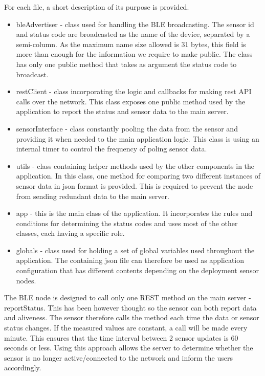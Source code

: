 For each file, a short description of its purpose is provided.
\begin{itemize}
\item bleAdvertiser - class used for handling the BLE broadcasting. The sensor id and status code are broadcasted as the name of the device, separated by a semi-column. As the maximum name size allowed is 31 bytes, this field is more than enough for the information we require to make public. The class has only one public method that takes as argument the status code to broadcast.
\item restClient - class incorporating the logic and callbacks for making rest API calls over the network. This class exposes one public method used by the application to report the status and sensor data to the main server.
\item sensorInterface - class constantly pooling the data from the sensor and providing it when needed to the main application logic. This class is using an internal timer to control the frequency of poling sensor data.
\item utils - class containing helper methods used by the other components in the application. In this class, one method for comparing two different instances of sensor data in json format is provided. This is required to prevent the node from sending redundant data to the main server.
\item app - this is the main class of the application. It incorporates the rules and conditions for determining the status codes and uses most of the other classes, each having a specific role.
\item globals - class used for holding a set of global variables used throughout the application. The containing json file can therefore be used as application configuration that has different contents depending on the deployment sensor nodes.
\end{itemize}

The BLE node is designed to call only one REST method on the main server - reportStatus. This has been however thought so the sensor can both report data and aliveness. The sensor therefore calls the method each time the data or sensor status changes. If the measured values are constant, a call will be made every minute. This ensures that the time interval between 2 sensor updates is 60 seconds or less. Using this approach allows the server to determine whether the sensor is no longer active/connected to the network and inform the users accordingly. 



